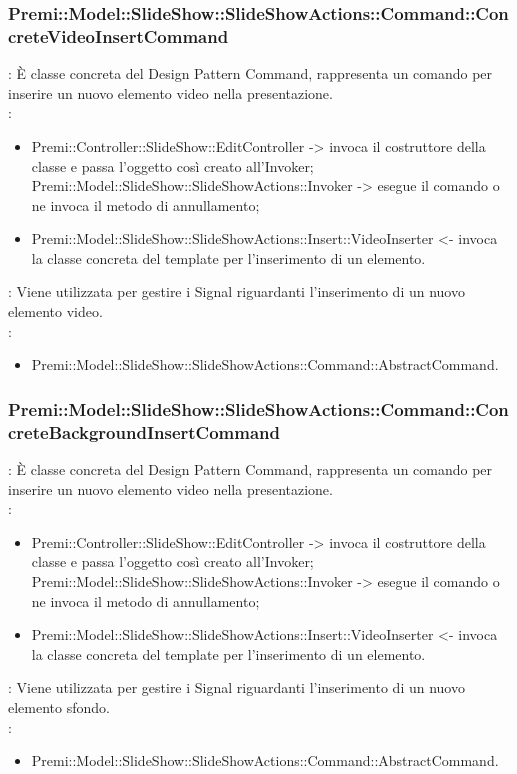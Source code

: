 {                \subsubsection{Premi::Model::SlideShow::SlideShowActions::Command::ConcreteVideoInsertCommand}{
				\textbf{\tipo}: È classe concreta del Design Pattern Command, rappresenta un comando per inserire un nuovo elemento video nella presentazione.\\	
				\textbf{\relaz}: 
				\begin{itemize}
					\item Premi::Controller::SlideShow::EditController -> invoca il costruttore della classe e passa l’oggetto così creato all’Invoker;
Premi::Model::SlideShow::SlideShowActions::Invoker -> esegue il comando o ne invoca il metodo di annullamento;
                    \item Premi::Model::SlideShow::SlideShowActions::Insert::VideoInserter <- invoca la classe concreta del template per l’inserimento di un elemento.
				\end{itemize}	
                \textbf{\interfacce}: Viene utilizzata per gestire i Signal riguardanti l’inserimento di un nuovo elemento video.\\
                \textbf{\base}: 
                    \begin{itemize}
                    \item Premi::Model::SlideShow::SlideShowActions::Command::AbstractCommand.
                    \end{itemize}
                    }
                \subsubsection{Premi::Model::SlideShow::SlideShowActions::Command::ConcreteBackgroundInsertCommand}{
				\textbf{\tipo}: È classe concreta del Design Pattern Command, rappresenta un comando per inserire un nuovo elemento video nella presentazione.\\	
				\textbf{\relaz}: 
				\begin{itemize}
					\item Premi::Controller::SlideShow::EditController -> invoca il costruttore della classe e passa l’oggetto così creato all’Invoker;
Premi::Model::SlideShow::SlideShowActions::Invoker -> esegue il comando o ne invoca il metodo di annullamento;
                    \item Premi::Model::SlideShow::SlideShowActions::Insert::VideoInserter <- invoca la classe concreta del template per l’inserimento di un elemento.
				\end{itemize}	
                \textbf{\interfacce}: Viene utilizzata per gestire i Signal riguardanti l’inserimento di un nuovo elemento sfondo.\\
                \textbf{\base}: 
                    \begin{itemize}
                    \item Premi::Model::SlideShow::SlideShowActions::Command::AbstractCommand.
                    \end{itemize}
                    }        
}
